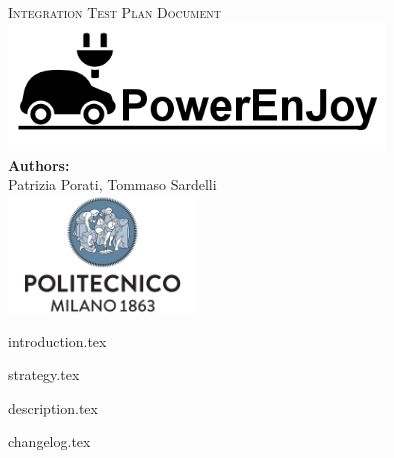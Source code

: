 \documentclass[a4paper,11pt]{article}
\begin{document}
\begin{titlepage}
\begin{center}
\textsc{\LARGE Integration Test Plan Document}\\[1.5cm] %

\includegraphics[width=10cm]{PowerEnJoy.png}\\
 
\vfill
\vfill
\textbf{Authors:}\\
Patrizia Porati, Tommaso Sardelli\\[2.0cm] 


\vfill
\vfill
\includegraphics[width=50mm]{polimi.png}\\
\end{center}
\end{titlepage}

\tableofcontents
\pagebreak


{introduction.tex}

{strategy.tex}


{description.tex}




{changelog.tex}
\end{document}
